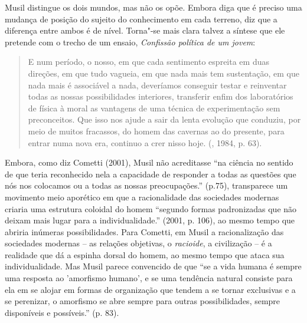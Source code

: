 Musil distingue os dois mundos, mas não os opõe. Embora diga que é
preciso uma mudança de posição do sujeito do conhecimento em cada
terreno, diz que a diferença entre ambos é de nível. Torna"-se mais clara
talvez a síntese que ele pretende com o trecho de um ensaio,
\emph{Confissão política de um jovem}:

\begin{quote}
E num período, o nosso, em que cada sentimento espreita em duas
direções, em que tudo vagueia, em que nada mais tem sustentação, em que
nada mais é associável a nada, deveríamos conseguir testar e reinventar
todas as nossas possibilidades interiores, transferir enfim dos
laboratórios de física à moral as vantagens de uma técnica de
experimentação sem preconceitos. Que isso nos ajude a sair da lenta
evolução que conduziu, por meio de muitos fracassos, do homem das
cavernas ao do presente, para entrar numa nova era, continuo a crer
nisso hoje. (, 1984, p. 63).
\end{quote}

Embora, como diz Cometti (2001), Musil não acreditasse ``na ciência no
sentido de que teria reconhecido nela a capacidade de responder a todas
as questões que nós nos colocamos ou a todas as nossas preocupações.''
(p.75), transparece um movimento meio aporético em que a racionalidade
das sociedades modernas criaria uma estrutura coloidal do homem
``segundo formas padronizadas que não deixam mais lugar para a
individualidade.'' (2001, p. 106), ao mesmo tempo que abriria inúmeras
possibilidades. Para Cometti, em Musil a racionalização das sociedades
modernas -- as relações objetivas, o \emph{racioide}, a civilização -- é
a realidade que dá a espinha dorsal do homem, ao mesmo tempo que ataca
sua individualidade. Mas Musil parece convencido de que ``se a vida
humana é sempre uma resposta ao 'amorfismo humano', e se uma tendência
natural consiste para ela em se alojar em formas de organização que
tendem a se tornar exclusivas e a se perenizar, o amorfismo se abre
sempre para outras possibilidades, sempre disponíveis e possíveis.'' (p.
83).

